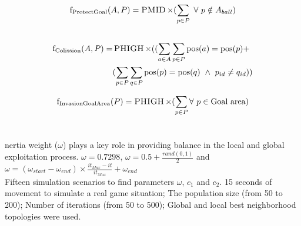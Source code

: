 \documentclass[a0,portrait]{sciposter}
\newcommand{\tituloA}[1]{\emph{\textbf{\color{white}{#1}}}}
\newcommand{\tituloB}[1]{\emph{\textbf{\color{blue}{#1}}}}
\begin{document}
\begin{multicols}{3}
    \[
    \begin{aligned}
        \operatorname{f_{ProtectGoal}}(A,P) = \mathop{\text{\textsc{PMID}}} \times ( \sum_{p \in P}  \ \forall \ p \notin A_{ball} )
    \end{aligned}
    \]



\subsection*{\tituloB{Respect SSL rules}}
    \[
    \begin{aligned}
        \operatorname{f_{Colission}}(A, P) = & \mathop{\text{\textsc{PHIGH}}} \times ((\sum_{a \in A} \sum_{p \in P} \operatorname{pos}(a) = \operatorname{pos}(p) + \\
        & (\sum_{p \in P} \sum_{q \in P} \operatorname{pos}(p) = \operatorname{pos}(q) \ \land \ p_{id} \neq q_{id}))
    \end{aligned}
    \]

    \[    
    \begin{aligned}
        \operatorname{f_{InvasionGoalArea}}(P) = \mathop{\text{\textsc{PHIGH}}} \times (\sum_{p \in P} \forall \ p \in \textrm{Goal area})
    \end{aligned}
    \]
    
\section*{\tituloA{Discovery best PSO parameters}}
    nertia weight ($\omega$) plays a key role in providing balance in the local and global exploitation process. $\omega = 0.7298$, $\omega = 0.5 + \frac{rand(0,1)}{2}$ and  $\omega = (\omega_{start} - \omega_{end}) \times \frac{it_{Max} - it}{it_{Max}} + \omega_{end}$ 
\\

    Fifteen simulation scenarios to find parameters $\omega$, $c_1$ and $c_2$. 15 seconds of movement to simulate a real game situation; The population size (from 50 to 200); Number of iterations (from 50 to 500); Global and local best neighborhood topologies were used. 
\\

\subsection*{\tituloB{Results}}


\end{multicols}
\end{document}
